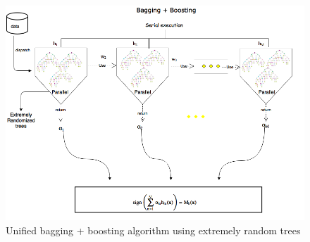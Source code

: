 \begin{figure}
\includegraphics[scale=0.6]{images/bagboost.png}
\caption{Unified bagging + boosting algorithm using extremely random trees}
\end{figure}


